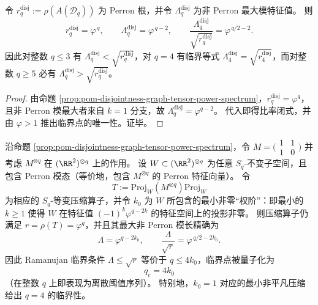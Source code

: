 \begin{corollary}[\texorpdfstring{$q=4$}{q=4} 为不交图层面 Ramanujan 比率的唯一整数临界点]\label{cor:pom-disjointness-ramanujan-q4-critical}
令 \(r_q^{\mathrm{disj}}:=\rho(A(\mathcal{D}_q))\) 为 Perron 根，并令 \(\Lambda_q^{\mathrm{disj}}\) 为非 Perron 最大模特征值。
则
\[
r_q^{\mathrm{disj}}=\varphi^{\,q},\qquad \Lambda_q^{\mathrm{disj}}=\varphi^{\,q-2},\qquad
\frac{\Lambda_q^{\mathrm{disj}}}{\sqrt{r_q^{\mathrm{disj}}}}=\varphi^{\,q/2-2}.
\]
因此对整数 \(q\le 3\) 有 \(\Lambda_q^{\mathrm{disj}}<\sqrt{r_q^{\mathrm{disj}}}\)，对 \(q=4\) 有临界等式 \(\Lambda_4^{\mathrm{disj}}=\sqrt{r_4^{\mathrm{disj}}}\)，而对整数 \(q\ge 5\) 必有 \(\Lambda_q^{\mathrm{disj}}>\sqrt{r_q^{\mathrm{disj}}}\)。
\end{corollary}
\begin{proof}
由命题 \ref{prop:pom-disjointness-graph-tensor-power-spectrum}，\(r_q^{\mathrm{disj}}=\varphi^q\)，且非 Perron 模最大者来自 \(k=1\) 分支，故 \(\Lambda_q^{\mathrm{disj}}=\varphi^{q-2}\)。
代入即得比率闭式，并由 \(\varphi>1\) 推出临界点的唯一性。证毕。
\end{proof}

\begin{conclusion}\label{con:pom-disjointness-sq-equivariant-critical-quantization}
沿命题 \ref{prop:pom-disjointness-graph-tensor-power-spectrum}，令
\(
M=\bigl(\begin{smallmatrix}1&1\\[2pt]1&0\end{smallmatrix}\bigr)
\)
并考虑 \(M^{\otimes q}\) 在 \((\RR^2)^{\otimes q}\) 上的作用。
设 \(W\subset(\RR^2)^{\otimes q}\) 为任意 \(S_q\)-不变子空间，且包含 Perron 模态（等价地，包含 \(M^{\otimes q}\) 的 Perron 特征向量）。
令
\[
T:=\mathrm{Proj}_W(M^{\otimes q})\mathrm{Proj}_W
\]
为相应的 \(S_q\)-等变压缩算子，并令 \(k_0\) 为 \(W\) 所包含的最小非零“权阶”：即最小的 \(k\ge 1\) 使得 \(W\) 在特征值 \((-1)^k\varphi^{q-2k}\) 的特征空间上的投影非零。
则压缩算子仍满足 \(r=\rho(T)=\varphi^q\)，并且其最大非 Perron 模长精确为
\[
\Lambda=\varphi^{q-2k_0},
\qquad
\frac{\Lambda}{\sqrt r}=\varphi^{\,q/2-2k_0}.
\]
因此 Ramanujan 临界条件 \(\Lambda\le \sqrt r\) 等价于 \(q\le 4k_0\)，临界点被量子化为
\[
\boxed{\;q_c=4k_0\;}
\]
（在整数 \(q\) 上即表现为离散阈值序列）。
特别地，\(k_0=1\) 对应的最小非平凡压缩给出 \(q=4\) 的临界性。
\end{conclusion}


